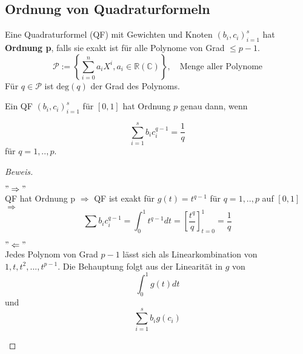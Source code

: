 \subsection{Ordnung von Quadraturformeln}

\begin{definition}
Eine Quadraturformel (QF) mit Gewichten und Knoten $(b_i, c_i)_{i=1}^{s}$ hat \textbf{Ordnung p}, falls sie exakt ist für alle Polynome von Grad $ \leq p-1$.\\
$$\mathcal{P} := \left\{ \sum_{i=0}^{n}a_iX^i, a_i \in \mathbb{R} (\mathbb{C}) \right\}, \quad \text{Menge aller Polynome}  $$
Für $q \in \mathcal{P}$ ist $\text{deg}(q)$ der Grad des Polynoms.
\end{definition}

\begin{theorem}
Ein QF $(b_i, c_i)_{i=1}^{s}$ für $[0,1]$ hat Ordnung $p$ genau dann, wenn

$$\sum_{i=1}^{s} b_i c_i^{q-1} = \frac{1}{q}$$ für $q = 1,..,p$.
\begin{proof}[Beweis]
\begin{description}
  \item
\end{description}
\begin{description}
  \item $"\Rightarrow"$ \\
  QF hat Ordnung p $\Rightarrow$ QF ist exakt für $g(t) = t^{q-1}$ für $q = 1,..,p$ auf $[0,1]$ \\
  $\Rightarrow$ $$\sum b_i c_i^{q-1} = \int_{0}^{1} t^{q-1} dt = \left[\frac{t^q}{q}\right]_{t=0}^{1} = \frac{1}{q}$$
  \item $"\Leftarrow"$\\
  Jedes Polynom von Grad $p-1$ lässt sich als Linearkombination von $1, t, t^2, ...,t^{p-1}$. Die Behauptung folgt aus der Linearität in $g$ von $$\int_{0}^{1} g(t) dt$$ und $$\sum_{i=1}^{s}b_i g(c_i)$$
\end{description}
\end{proof}
\end{theorem}

